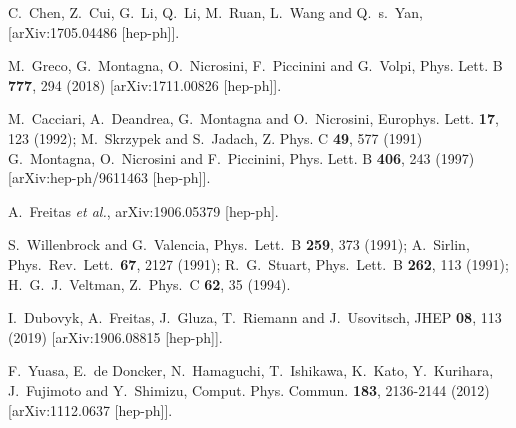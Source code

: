\documentclass[12pt]{article}
\begin{document}
\begin{thebibliography}{99}
C.~Chen, Z.~Cui, G.~Li, Q.~Li, M.~Ruan, L.~Wang and Q.~s.~Yan,
[arXiv:1705.04486 [hep-ph]].

M.~Greco, G.~Montagna, O.~Nicrosini, F.~Piccinini and G.~Volpi,
Phys. Lett. B \textbf{777}, 294 (2018)
[arXiv:1711.00826 [hep-ph]].

M.~Cacciari, A.~Deandrea, G.~Montagna and O.~Nicrosini,
Europhys. Lett. \textbf{17}, 123 (1992);
M.~Skrzypek and S.~Jadach,
Z. Phys. C \textbf{49}, 577 (1991)
G.~Montagna, O.~Nicrosini and F.~Piccinini,
Phys. Lett. B \textbf{406}, 243 (1997)
[arXiv:hep-ph/9611463 [hep-ph]].

  A.~Freitas {\it et al.},
  arXiv:1906.05379 [hep-ph].

  S.~Willenbrock and G.~Valencia,
  Phys.\ Lett.\ B {\bf 259}, 373 (1991); %
  A.~Sirlin,
  Phys.\ Rev.\ Lett.\  {\bf 67}, 2127 (1991); %
  R.~G.~Stuart,
  Phys.\ Lett.\ B {\bf 262}, 113 (1991); %
  H.~G.~J.~Veltman,
  Z.\ Phys.\ C {\bf 62}, 35 (1994).

I.~Dubovyk, A.~Freitas, J.~Gluza, T.~Riemann and J.~Usovitsch,
JHEP \textbf{08}, 113 (2019)
[arXiv:1906.08815 [hep-ph]].

F.~Yuasa, E.~de Doncker, N.~Hamaguchi, T.~Ishikawa, K.~Kato, Y.~Kurihara, J.~Fujimoto and Y.~Shimizu,
Comput. Phys. Commun. \textbf{183}, 2136-2144 (2012)
[arXiv:1112.0637 [hep-ph]].


\end{thebibliography}
\end{document}
